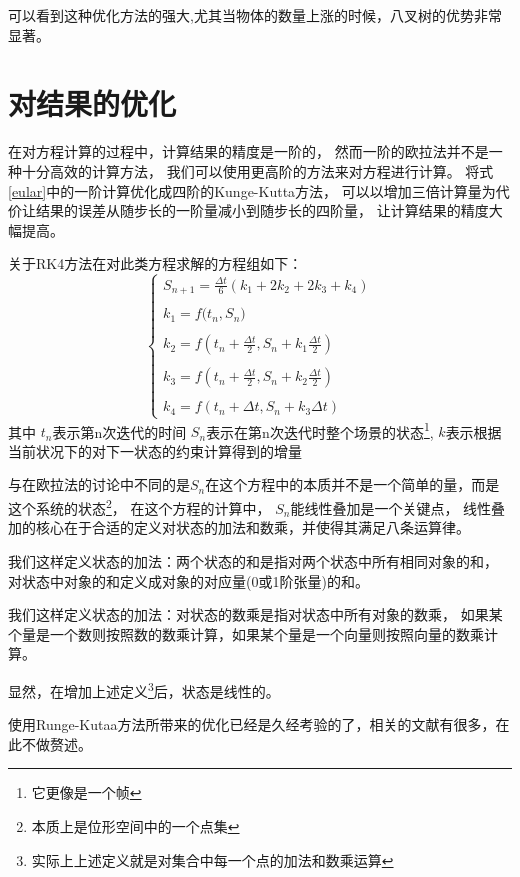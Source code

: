 可以看到这种优化方法的强大,尤其当物体的数量上涨的时候，八叉树的优势非常显著。

\section{对结果的优化}
在对方程计算的过程中，计算结果的精度是一阶的，
然而一阶的欧拉法并不是一种十分高效的计算方法，
我们可以使用更高阶的方法来对方程进行计算。
将式\ref{eular}中的一阶计算优化成四阶的Kunge-Kutta方法，
可以以增加三倍计算量为代价让结果的误差从随步长的一阶量减小到随步长的四阶量，
让计算结果的精度大幅提高。

\noindent 关于RK4方法在对此类方程求解的方程组如下：
\[ 
\left \{
\begin{array}{lr}
{\displaystyle S_{n+1} = \frac{\Delta t}{6} (k_1+2k_2+2k_3+k_4)}\\\\
{\displaystyle k_1 = f(t_n,S_n})\\\\
{\displaystyle k_2 = f(t_n+\frac{\Delta t}{2},S_n+k_1\frac{\Delta t}{2})}\\\\
{\displaystyle k_3 = f(t_n+\frac{\Delta t}{2},S_n+k_2\frac{\Delta t}{2})}\\\\
{\displaystyle k_4 = f(t_n+{\Delta t},S_n+k_3\Delta t)}
\end{array}
\right.
 \]
其中
$t_n$表示第n次迭代的时间
$S_n$表示在第n次迭代时整个场景的状态\footnote{它更像是一个帧},
$k$表示根据当前状况下的对下一状态的约束计算得到的增量

与在欧拉法的讨论中不同的是$S_n$在这个方程中的本质并不是一个简单的量，而是这个系统的状态\footnote{本质上是位形空间中的一个点集}，
在这个方程的计算中，
$S_n$能线性叠加是一个关键点，
线性叠加的核心在于合适的定义对状态的加法和数乘，并使得其满足八条运算律。

我们这样定义状态的加法：两个状态的和是指对两个状态中所有相同对象的和，
对状态中对象的和定义成对象的对应量(0或1阶张量)的和。

我们这样定义状态的加法：对状态的数乘是指对状态中所有对象的数乘，
如果某个量是一个数则按照数的数乘计算，如果某个量是一个向量则按照向量的数乘计算。

显然，在增加上述定义\footnote{实际上上述定义就是对集合中每一个点的加法和数乘运算}后，状态是线性的。

使用Runge-Kutaa方法所带来的优化已经是久经考验的了，相关的文献有很多，在此不做赘述。

